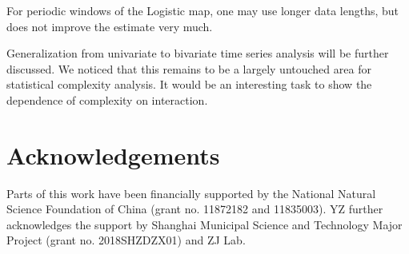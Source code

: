 \documentclass[12pt,aip,cha,reprint,nofootinbib]{revtex4-1}
\begin{document}
For periodic windows of the Logistic map, one may use longer data lengths, but does not improve the estimate very much. 

Generalization from univariate to bivariate time series analysis will be further discussed. We noticed that this remains to be a largely untouched area for statistical complexity analysis. It would be an interesting task to show the dependence of complexity on interaction. 

\section*{Acknowledgements}
Parts of this work have been financially supported by the National Natural Science Foundation of China (grant no. 11872182 and 11835003). YZ further acknowledges the support by Shanghai Municipal Science and Technology Major Project (grant no. 2018SHZDZX01) and ZJ Lab. 



\end{document}
